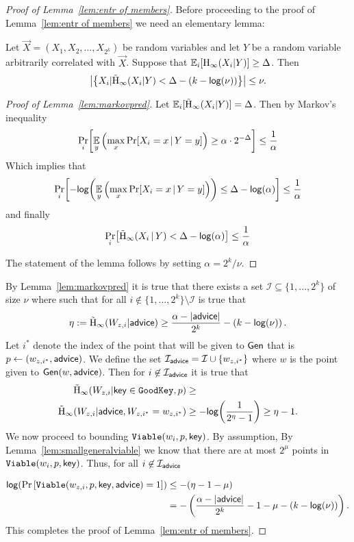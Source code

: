 \begin{proof}[Proof of Lemma~\ref{lem:entr of members}]
\noindent
Before proceeding to the proof of Lemma~\ref{lem:entr of members} we need an elementary lemma:
\begin{lemma}
    \label{lem:markovpred}
    Let $\vec{X} = (X_1, X_2, \ldots, X_{2^k})$ be random variables and let $Y$ be a random variable arbitrarily correlated with $\vec{X}$. Suppose that $\operatorname*{\mathbb{E}}_i[\mathrm{H}_\infty(X_i | Y)] \ge \Delta$. Then 
    \[
    \left|\left\{X_i | \tilde{\mathrm{H}}_\infty(X_i |Y) < \Delta - (k-\mathsf{log}\!\left(\nu\right))\right\}\right|\le \nu.
    \]
\end{lemma}
\begin{proof}[Proof of Lemma~\ref{lem:markovpred}]
Let $\operatorname*{\mathbb{E}}_i [\tilde{\mathrm{H}}_\infty(X_i|Y)] = \Delta$. Then by Markov's inequality
\[
    \Pr\limits_{i}\!\left[\operatorname*{\mathbb{E}}_{y}\left( \max\limits_{x} \Pr\!\left[X_i = x \,|\, Y = y\right]\right) \geq \alpha \cdot 2^{-\Delta}\right] \leq \frac{1}{\alpha} 
  \]
  Which implies that 
      \[  
    \Pr\limits_{i}\!\left[-\mathsf{log}\!\left(\operatorname*{\mathbb{E}}_y\left(\max\limits_{x} \Pr\!\left[X_i = x \,|\, Y = y\right]\right)\right) \leq \Delta -\mathsf{log}\!\left(\alpha\right)\right] \leq \frac{1}{\alpha} 
    \]
      and finally
        \[
      \Pr\limits_{i}\!\left[\tilde{\mathrm{H}}_\infty(X_i\, |\, Y)< \Delta -\mathsf{log}\!\left(\alpha\right)\right] \leq \frac{1}{\alpha}
      \]

The statement of the lemma follows by setting $\alpha = 2^k/\nu$.
\end{proof}
By Lemma~\ref{lem:markovpred} it is true that there exists a set $\mathcal{I}\subseteq \{1,...,2^k\}$ of size $\nu$ where  such that for all $i\not \in \{1,...,2^k\} \setminus\mathcal{I}$ is true that 
\[
\eta:=\tilde{\mathrm{H}}_\infty(W_{z,i} | {\mathsf{advice}}) \ge \frac{\alpha -|{\mathsf{advice}}|}{2^k} -\left(k-\mathsf{log}\!\left(\nu\right)\right).
\]
Let $i^*$ denote the index of the point that will be given to ${\mathsf{Gen}}$ that is $p\leftarrow (w_{z,i^*}, {\mathsf{advice}})$.  We define the set $\mathcal{I}_{\mathsf{advice}} = \mathcal{I} \cup \{w_{z,i^*}\}$ where $w$ is the point given to ${\mathsf{Gen}}(w, {\mathsf{advice}})$.  
Then for $i\not\in \mathcal{I}_{{\mathsf{advice}}}$ it is true that 
\begin{align*}
\tilde{\mathrm{H}}_\infty(W_{z,i} | \mathsf{key} \in \mathtt{GoodKey}, p)&\ge \\
\tilde{\mathrm{H}}_\infty(W_{z,i} | {\mathsf{advice}}, W_{z,i^*}= w_{z,i^*}) &\ge -\mathsf{log}\!\left(\frac{1}{2^{\eta}-1}\right) \ge \eta-1.
\end{align*}
We now proceed to bounding $\mathtt{Viable}(w_i, p, \mathsf{key})$.  By assumption, By Lemma~\ref{lem:smallgeneralviable} we know that there are at most $2^\mu$ points in $\mathtt{Viable}(w_i, p, \mathsf{key})$.  Thus, for all $i\not \in\mathcal{I}_{{\mathsf{advice}}}$ 

\begin{align*}
\mathsf{log}\!\left(\Pr\left[\mathtt{Viable}(w_{z,i}, p, \mathsf{key}, {\mathsf{advice}}) = 1 \right]\right)&\le - (\eta-1 -\mu) \\
&=-\left(\frac{\alpha -|{\mathsf{advice}}| }{2^k}-1-\mu-\left(k-\mathsf{log}\!\left(\nu\right)\right)\right).
\end{align*}
This completes the proof of Lemma~\ref{lem:entr of members}.
\end{proof}



